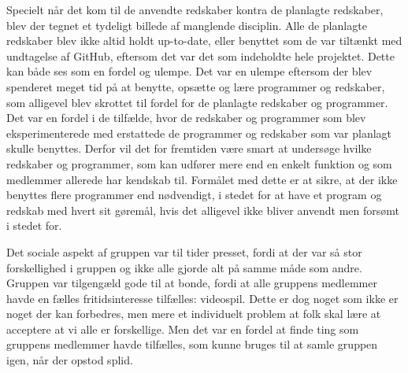 \vspace{5mm}

	Specielt når det kom til de anvendte redskaber kontra de planlagte redskaber, blev der tegnet et tydeligt billede af manglende disciplin. Alle de planlagte redskaber blev ikke altid holdt up-to-date, eller benyttet som de var tiltænkt med undtagelse af GitHub, eftersom det var det som indeholdte hele projektet. Dette kan både ses som en fordel og ulempe. Det var en ulempe eftersom der blev spenderet meget tid på at benytte, opsætte og lære programmer og redskaber, som alligevel blev skrottet til fordel for de planlagte redskaber og programmer. Det var en fordel i de tilfælde, hvor de redskaber og programmer som blev eksperimenterede med erstattede de programmer og redskaber som var planlagt skulle benyttes. Derfor vil det for fremtiden være smart at undersøge hvilke redskaber og programmer, som kan udfører mere end en enkelt funktion og som medlemmer allerede har kendskab til. Formålet med dette er at sikre, at der ikke benyttes flere programmer end nødvendigt, i stedet for at have et program og redskab med hvert sit gøremål, hvis det alligevel ikke bliver anvendt men forsømt i stedet for. 

	\vspace{5mm}
	Det sociale aspekt af gruppen var til tider presset, fordi at der var så stor forskellighed i gruppen og ikke alle gjorde alt på samme måde som andre. Gruppen var tilgengæld gode til at bonde, fordi at alle gruppens medlemmer havde en fælles fritidsinteresse tilfælles: videospil. Dette er dog noget som ikke er noget der kan forbedres, men mere et individuelt problem at folk skal lære at acceptere at vi alle er forskellige. Men det var en fordel at finde ting som gruppens medlemmer havde tilfælles, som kunne bruges til at samle gruppen igen, når der opstod splid.